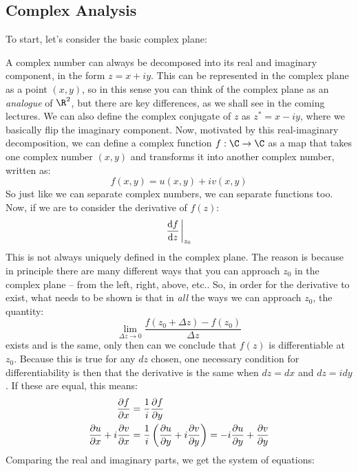 \subsection{Complex Analysis}
To start, let's consider the basic complex plane:
\begin{center}
\end{center}
A complex number can always be decomposed into its real and imaginary component, in the form \( z = x + iy
\). This can be represented in the complex plane as a point \( (x,y) \), so in this sense you can think of
the complex plane as an \textit{analogue} of \( \R^2 \), but there are key differences, as we shall see in
the coming lectures. 
We can also define the complex conjugate of \( z \) as \( z^{*} = x - iy \), where we basically flip the
imaginary component. Now, motivated by this real-imaginary decomposition, we can define a complex function \(
f : \C \to \C \) as a map that takes one complex number \( (x, y) \) and transforms it into another complex
number, written as:
\[
	f(x, y) = u(x, y) + iv(x, y)
\]
So just like we can separate complex numbers, we can separate functions too. Now, if we are to consider the
derivative of \( f(z) \):
\[
	\dv{f}{z}\eval_{z_0}
\]
This is not always uniquely defined in the complex plane. The reason is because in principle there are many
different ways that you can approach \( z_0 \) in the complex plane -- from the left, right, above, etc.. So,
in order for the derivative to exist, what needs to be shown is that in \textit{all} the ways we can approach \(
z_0\), the quantity:
\[
	\lim_{\Delta z \to 0 } \frac{f(z_0 + \Delta z) - f(z_0)}{\Delta z}
\]
exists and is the same, only then can we conclude that \( f(z) \) is differentiable at \( z_0 \). Because
this is true for any \( dz \) chosen, one necessary condition for differentiability is then that the
derivative is the same when \( dz = dx \) and \( dz = i dy \). If these are equal, this means:
\begin{align*}
	\pdv{f}{x} &= \frac{1}{i}\pdv{f}{y} \\ 
	\pdv{u}{x} + i\pdv{v}{x} &= \frac{1}{i}\left( \pdv{u}{y} + i \pdv{v}{y} \right) = -i \pdv{u}{y} +
	\pdv{v}{y}
\end{align*}
Comparing the real and imaginary parts, we get the system of equations: 
